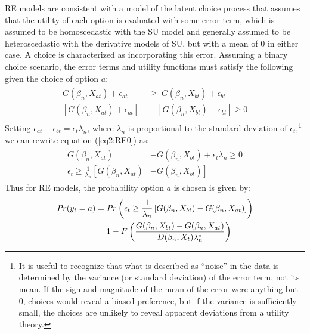 \documentclass[../main.tex]{subfiles}
\begin{document}
RE models are consistent with a model of the latent choice process that assumes that the utility of each option is evaluated with some error term, which is assumed to be homoscedastic with the SU model and generally assumed to be heteroscedastic with the derivative models of SU, but with a mean of $0$ in either case.
A choice is characterized as incorporating this error.
Assuming a binary choice scenario, the error terms and utility functions must satisfy the following given the choice of option $a$:
\begin{align}
	\label{eq2:RE0}
	\begin{split}
		G(\beta_n,X_{at}) + \epsilon_{at} \;&\geq\; G(\beta_n,X_{bt}) + \epsilon_{bt}\\
		\left[G(\beta_n,X_{at}) + \epsilon_{at}\right] \;&-\; \left[G(\beta_n,X_{bt}) + \epsilon_{bt}\right] \geq 0
	\end{split}
\end{align}
\noindent Setting $\epsilon_{at} - \epsilon_{bt} = \epsilon_t\lambda_n$, where $\lambda_n$ is proportional to the standard deviation of $\epsilon_t$,\footnote{
	It is useful to recognize that what is described as \enquote{noise} in the data is determined by the variance (or standard deviation) of the error term, not its mean.
	If the sign and magnitude of the mean of the error were anything but 0, choices would reveal a biased preference, but if the variance is sufficiently small, the choices are unlikely to reveal apparent deviations from a utility theory.} we can rewrite equation (\ref{eq2:RE0}) as:
\begin{align}
	\label{eq2:RE1}
	\begin{split}
		G(\beta_n,X_{at}) &- G(\beta_n,X_{bt}) + \epsilon_t\lambda_n \geq 0\\
		\epsilon_t \geq \frac{1}{\lambda_n} \left[ G(\beta_n,X_{at}) \right.  &- \left. G(\beta_n,X_{bt}) \right]
	\end{split}
\end{align}
\noindent Thus for RE models, the probability option $a$ is chosen is given by:
\begin{align}
	\label{eq2:RE.2}
	\begin{split}
	{\ensuremath{\mathit{Pr}}}(y_t = a) &= {\mathit{Pr}}\left(  \epsilon_t \geq \frac{1}{\lambda_n} \left[ G(\beta_n,X_{bt}) - G(\beta_n,X_{at}) \right] \right)\\
	&= 1 - F\left( \dfrac{G(\beta_n,X_{bt}) - G(\beta_n,X_{at})}{D(\beta_n,X_t)\lambda_n^* }  \right)
	\end{split}
\end{align}
\end{document}

